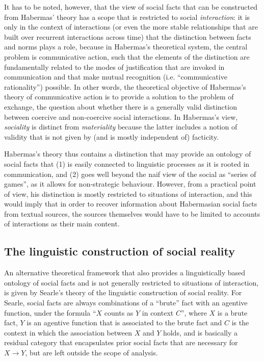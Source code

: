 It has to be noted, however, that the view of social facts that can be constructed from Habermas' theory has a scope that is restricted to social \emph{interaction}: it is only in the context of interactions (or even the more stable relationships that are built over recurrent interactions across time) that the distinction between facts and norms plays a role, because in Habermas's theoretical system, the central problem is communicative action, such that the elements of the distinction are fundamentally related to the modes of justification that are invoked in communication and that make mutual recognition (i.e. ``communicative rationality'') possible.
In other words, the theoretical objective of Habermas's theory of communicative action is to provide a solution to the problem of exchange, the question about whether there is a generally valid distinction between coercive and non-coercive social interactions.
In Habermas's view, \emph{sociality} is distinct from \emph{materiality} because the latter includes a notion of validity that is not given by (and is mostly independent of) facticity.

Habermas's theory thus contains a distinction that may provide an ontology of social facts that (1) is easily connected to linguistic processes as it is rooted in communication, and (2) goes well beyond the naif view of the social as ``series of games'', as it allows for non-strategic behaviour.
However, from a practical point of view, his distinction is mostly restricted to situations of interaction, and this would imply that in order to recover information about Habermasian social facts from textual sources, the sources themselves would have to be limited to accounts of interactions as their main content.

\subsection{The linguistic construction of social reality}
\label{subsec:xyc}

An alternative theoretical framework that also provides a linguistically based ontology of social facts and is not generally restricted to situations of interaction, is given by Searle's theory of the linguistic construction of social reality. %
For Searle, social facts are always combinations of a ``brute'' fact with an agentive function, under the formula ``$X$ counts as $Y$ in context $C$'', where $X$ is a brute fact, $Y$ is an agentive function that is associated to the brute fact and $C$ is the context in which the association between $X$ and $Y$ holds, and is basically a residual category that encapsulates prior social facts that are necessary for $X \rightarrow Y$, but are left outside the scope of analysis.

